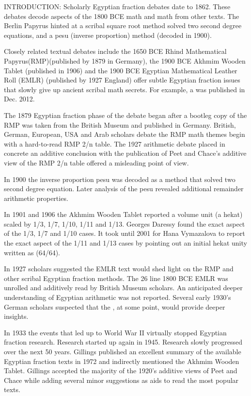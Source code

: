 \documentclass[12pt]{article}
\begin{document}
INTRODUCTION: Scholarly Egyptian fraction debates date to 1862. These debates decode aspects of the 1800 BCE   math and math from other texts. The Berlin Papyrus hinted at a scribal square root method  solved two second degree equations, and  a pesu (inverse proportion) method (decoded in 1900). 

Closely related textual debates include the 1650 BCE Rhind Mathematical Papyrus(RMP)(published by 1879 in Germany), the 1900 BCE Akhmim Wooden Tablet (published in 1906)  and the 1900 BCE Egyptian Mathematical Leather Roll (EMLR) (published by 1927 England) offer subtle Egyptian fraction issues that slowly give up ancient scribal math secrets.  For example, a   was published in Dec. 2012.

The 1879 Egyptian fraction phase of the debate began after a bootleg copy of the RMP was taken from the British Museum and published in Germany. British, German, European, USA and Arab scholars debate the RMP math themes begin with a hard-to-read RMP 2/n table. The 1927 arithmetic debate placed in concrete an additive conclusion with the publication of Peet and Chace's additive view of the RMP 2/n table offered a misleading point of view. 

In 1900 the inverse proportion pesu was decoded as a method that solved two second degree equation. Later analysis of the pesu revealed additional remainder arithmetic properties.

In 1901 and 1906 the Akhmim Wooden Tablet reported a volume unit (a hekat) scaled by 1/3, 1/7, 1/10, 1/11 and 1/13. Georges Daressy found the exact aspect of the 1/3, 1/7 and 1/10 cases. It took until 2001 for Hana Vymazalova to report the exact aspect of the 1/11 and 1/13 cases by pointing out an initial hekat unity written as (64/64).   

In 1927 scholars suggested the EMLR text would shed light on the RMP and other scribal Egyptian fraction methods. The 26 line 1800 BCE EMLR was unrolled and additively read by British Museum scholars. An anticipated deeper understanding of Egyptian arithmetic was not reported. Several early 1930's German scholars suspected that the , at some point, would provide deeper insights. 

In 1933 the events that led up to World War II virtually stopped Egyptian fraction research. Research started up again in 1945. Research slowly progressed over the next 50 years. Gillings published an excellent summary of the available Egyptian fraction texts in 1972 and indirectly mentioned the Akhmim Wooden Tablet. Gillings accepted the majority of the 1920's additive views of Peet and Chace while adding several minor suggestions as aids to read the most popular texts.
\end{document}
